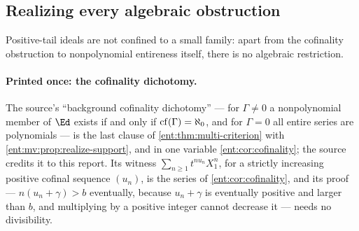 \documentclass[11pt]{article}
\theoremstyle{plain}
\theoremstyle{plain}
\theoremstyle{plain}
\theoremstyle{definition}
\theoremstyle{definition}
\theoremstyle{definition}
\theoremstyle{definition}
\theoremstyle{remark}
\begin{document}
\subsection{Realizing every algebraic obstruction}
\label{ent:as:subsec:realization}

Positive-tail ideals are not confined to a small family: apart from the
cofinality obstruction to nonpolynomial entireness itself, there is no
algebraic restriction.

\paragraph{Printed once: the cofinality dichotomy.} The source's
``background cofinality dichotomy'' --- for $\Gamma\ne0$ a nonpolynomial member
of $\Ed$ exists if and only if $\operatorname{cf}(\Gamma)=\aleph_0$, and for $\Gamma=0$ all
entire series are polynomials --- is the last clause of
\cref{ent:thm:multi-criterion} with \cref{ent:mv:prop:realize-support}, and in
one variable \cref{ent:cor:cofinality}; the source credits it to this report.
Its witness $\sum_{n\ge1}t^{nu_n}X_1^n$, for a strictly increasing positive
cofinal sequence $(u_n)$, is the series of \cref{ent:cor:cofinality}, and its
proof --- $n(u_n+\gamma)>b$ eventually, because $u_n+\gamma$ is eventually
positive and larger than $b$, and multiplying by a positive integer cannot
decrease it --- needs no divisibility.
\end{document}
